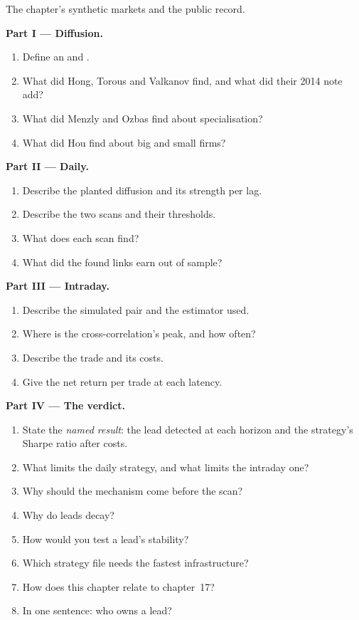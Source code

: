\begin{problem}\label{pb:s1:cross-asset-lead-lag:1}
The chapter's synthetic markets and the public record.

\medskip\noindent\textbf{Part I --- Diffusion.}
\begin{enumerate}
\item Define an  and .
\item What did Hong, Torous and Valkanov find, and what did their 2014 note add?
\item What did Menzly and Ozbas find about specialisation?
\item What did Hou find about big and small firms?
\end{enumerate}

\medskip\noindent\textbf{Part II --- Daily.}
\begin{enumerate}[resume]
\item Describe the planted diffusion and its strength per lag.
\item Describe the two scans and their thresholds.
\item What does each scan find?
\item What did the found links earn out of sample?
\end{enumerate}

\medskip\noindent\textbf{Part III --- Intraday.}
\begin{enumerate}[resume]
\item Describe the simulated pair and the estimator used.
\item Where is the cross-correlation's peak, and how often?
\item Describe the trade and its costs.
\item Give the net return per trade at each latency.
\end{enumerate}

\medskip\noindent\textbf{Part IV --- The verdict.}
\begin{enumerate}[resume]
\item State the \emph{named result}: the lead detected at each horizon and the strategy's Sharpe ratio after costs.
\item What limits the daily strategy, and what limits the intraday one?
\item Why should the mechanism come before the scan?
\item Why do leads decay?
\item How would you test a lead's stability?
\item Which strategy file needs the fastest infrastructure?
\item How does this chapter relate to chapter~17?
\item In one sentence: who owns a lead?
\end{enumerate}
\end{problem}

